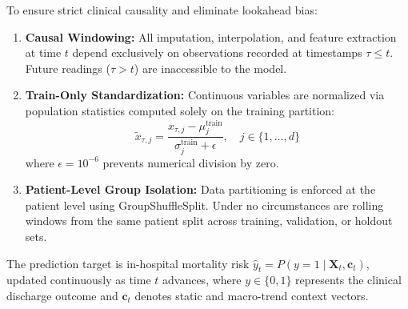 \documentclass[conference]{IEEEtran}
\begin{document}
To ensure strict clinical causality and eliminate lookahead bias:
\begin{enumerate}
    \item \textbf{Causal Windowing:} All imputation, interpolation, and feature extraction at time $t$ depend exclusively on observations recorded at timestamps $\tau \le t$. Future readings ($\tau > t$) are inaccessible to the model.
    \item \textbf{Train-Only Standardization:} Continuous variables are normalized via population statistics computed solely on the training partition:
    \begin{equation}
        \tilde{x}_{\tau, j} = \frac{x_{\tau, j} - \mu_j^{\text{train}}}{\sigma_j^{\text{train}} + \epsilon}, \quad j \in \{1, \dots, d\}
    \end{equation}
    where $\epsilon = 10^{-6}$ prevents numerical division by zero.
    \item \textbf{Patient-Level Group Isolation:} Data partitioning is enforced at the patient level using GroupShuffleSplit. Under no circumstances are rolling windows from the same patient split across training, validation, or holdout sets.
\end{enumerate}

The prediction target is in-hospital mortality risk $\hat{y}_t = P(y=1 \mid \mathbf{X}_t, \mathbf{c}_t)$, updated continuously as time $t$ advances, where $y \in \{0, 1\}$ represents the clinical discharge outcome and $\mathbf{c}_t$ denotes static and macro-trend context vectors.
\end{document}
